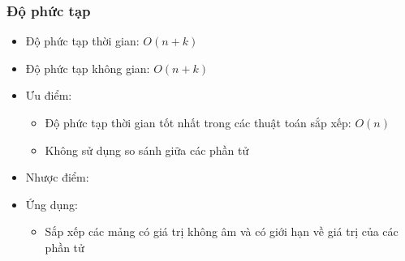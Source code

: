 \subsubsection{Độ phức tạp}

\begin{itemize}
    \item Độ phức tạp thời gian: $O(n + k)$
    \item Độ phức tạp không gian: $O(n + k)$
    \item Ưu điểm:
        \begin{itemize}
            \item Độ phức tạp thời gian tốt nhất trong các thuật toán sắp xếp: $O(n)$
            \item Không sử dụng so sánh giữa các phần tử
        \end{itemize}
    \item Nhược điểm:
    \item Ứng dụng:
        \begin{itemize}
            \item Sắp xếp các mảng có giá trị không âm và có giới hạn về giá trị của các phần tử
        \end{itemize}
\end{itemize}

